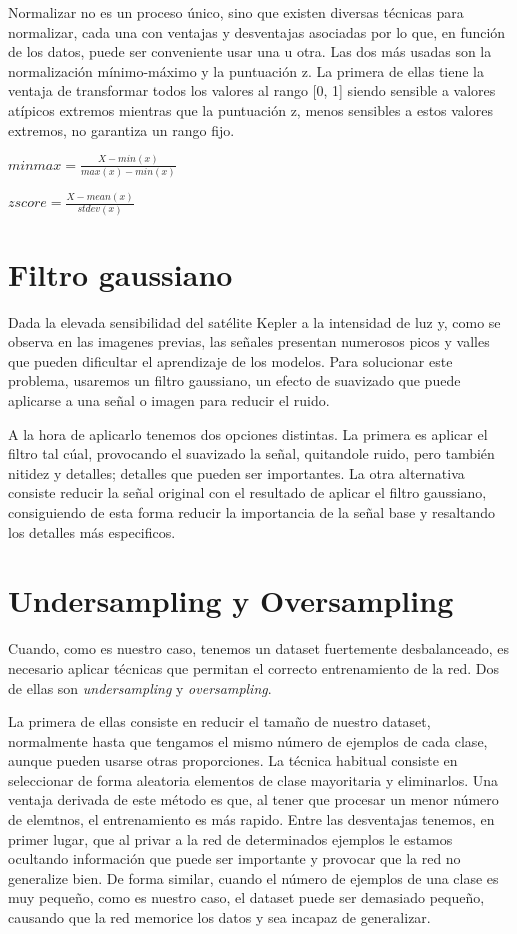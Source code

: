 Normalizar no es un proceso único, sino que existen diversas técnicas para normalizar, cada una con ventajas y desventajas asociadas por lo que, en función de los datos, puede ser conveniente usar una u otra. Las dos más usadas son la normalización mínimo-máximo y la puntuación z. La primera de ellas tiene la ventaja de transformar todos los valores al rango [0, 1] siendo sensible a valores atípicos extremos mientras que la puntuación z, menos sensibles a estos valores extremos, no garantiza un rango fijo.

\begin{math}
	minmax = \frac{X - min(x)}{max(x) - min(x)}
\end{math}

\begin{math}	
	zscore = \frac{X - mean(x)}{stdev(x)}
\end{math}

\section{Filtro gaussiano}\label{filtro-gaussiano}
Dada la elevada sensibilidad del satélite Kepler a la intensidad de luz y, como se observa en las imagenes previas, las señales presentan numerosos picos y valles que pueden dificultar el aprendizaje de los modelos. Para solucionar este problema, usaremos un filtro gaussiano, un efecto de suavizado que puede aplicarse a una señal o imagen para reducir el ruido.

A la hora de aplicarlo tenemos dos opciones distintas. La primera es aplicar el filtro tal cúal, provocando el suavizado la señal, quitandole ruido, pero también nitidez y detalles; detalles que pueden ser importantes. La otra alternativa consiste reducir la señal original con el resultado de aplicar el filtro gaussiano, consiguiendo de esta forma reducir la importancia de la señal base y resaltando los detalles más especificos.

\section{Undersampling y Oversampling}\label{undersampling-y-oversampling}
Cuando, como es nuestro caso, tenemos un dataset fuertemente desbalanceado, es necesario aplicar técnicas que permitan el correcto entrenamiento de la red. Dos de ellas son \textit{undersampling} y \textit{oversampling}.

La primera de ellas consiste en reducir el tamaño de nuestro dataset, normalmente hasta que tengamos el mismo número de ejemplos de cada clase, aunque pueden usarse otras proporciones. La técnica habitual consiste en seleccionar de forma aleatoria elementos de clase mayoritaria y eliminarlos. Una ventaja derivada de este método es que, al tener que procesar un menor número de elemtnos, el entrenamiento es más rapido. Entre las desventajas tenemos, en primer lugar, que al privar a la red de determinados ejemplos le estamos ocultando información que puede ser importante y provocar que la red no generalize bien. De forma similar, cuando el número de ejemplos de una clase es muy pequeño, como es nuestro caso, el dataset puede ser demasiado pequeño, causando que la red memorice los datos y sea incapaz de generalizar.

